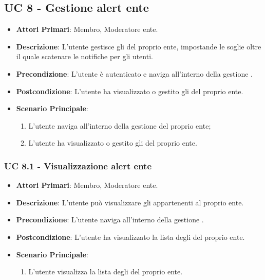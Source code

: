 	\subsection{UC 8 - Gestione alert ente}
			
		\begin{itemize}
			\item \textbf{Attori Primari}: Membro, Moderatore ente.
			\item \textbf{Descrizione}: L'utente gestisce gli  del proprio ente, impostande le soglie oltre il quale scatenare le notifiche per gli utenti.
			\item \textbf{Precondizione}: L'utente è autenticato e naviga all'interno della gestione .
			\item \textbf{Postcondizione}: L'utente ha visualizzato o gestito gli  del proprio ente.
			\item \textbf{Scenario Principale}:
			\begin{enumerate}
				\item{L'utente naviga all'interno della gestione  del proprio ente;}
				\item{L'utente ha visualizzato o gestito gli  del proprio ente.}
			\end{enumerate}	
		\end{itemize}
			
			\subsubsection{UC 8.1 - Visualizzazione alert ente}
			\begin{itemize}
				\item \textbf{Attori Primari}: Membro, Moderatore ente.
				\item \textbf{Descrizione}: L'utente può visualizzare gli  appartenenti al proprio ente.
				\item \textbf{Precondizione}: L'utente naviga all'interno della gestione .
				\item \textbf{Postcondizione}: L'utente ha visualizzato la lista degli  del proprio ente.
				\item \textbf{Scenario Principale}:
				\begin{enumerate}
					\item{L'utente visualizza la lista degli  del proprio ente.}
				\end{enumerate}	
			\end{itemize}
			
